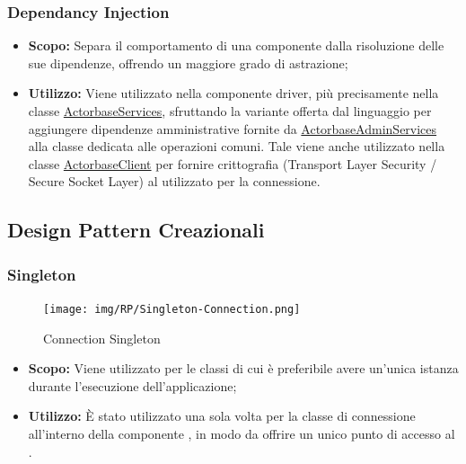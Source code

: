 \documentclass{scalatekids-article}
\begin{document}
\subsubsection{Dependancy Injection}
\begin{itemize}
\item \textbf{Scopo:} Separa il comportamento di una componente dalla risoluzione
  delle sue dipendenze, offrendo un maggiore grado di astrazione;
\item \textbf{Utilizzo:} Viene utilizzato nella componente driver, più
  precisamente nella classe
  \hyperref[sec:actorbase::driver::ActorbaseServices]{ActorbaseServices},
  sfruttando la variante  offerta dal linguaggio 
  per aggiungere dipendenze amministrative fornite da
  \hyperref[sec:actorbase::driver::ActorbaseAdminservices]{ActorbaseAdminServices}
  alla classe dedicata alle operazioni comuni. Tale  viene anche
  utilizzato nella classe \hyperref[sec:actorbase::driver::client::ActorbaseClient]{ActorbaseClient}
  per fornire crittografia  (Transport Layer Security / Secure Socket Layer) al 
  utilizzato per la connessione.

\end{itemize}

\subsection{Design Pattern Creazionali}
\subsubsection{Singleton}

\begin{figure}[H]
  \begin{center}
    \texttt{[image: img/RP/Singleton-Connection.png]}
    \caption{Connection Singleton}
  \end{center}
\end{figure}

\begin{itemize}
\item \textbf{Scopo:} Viene utilizzato per le classi di cui è preferibile avere un'unica istanza
  durante l'esecuzione dell'applicazione;
\item \textbf{Utilizzo:} È stato utilizzato una sola volta per la classe di connessione all'interno
  della componente , in modo da offrire un unico punto di accesso al .
\end{itemize}
\end{document}
